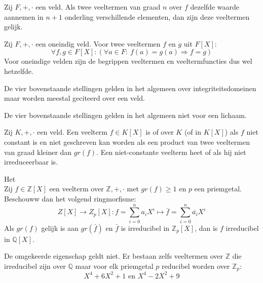 \documentclass[main.tex]{subfiles}
\begin{document}
\begin{st}
  Zij $F,+,\cdot$ een veld.
  Als twee veeltermen van graad $n$ over $f$ dezelfde waarde aannemen in $n+1$ onderling verschillende elementen, dan zijn deze veeltermen gelijk.
\end{st}

\begin{st}
  Zij $F,+,\cdot$ een oneindig veld.
  Voor twee veeltermen $f$ en $g$ uit $F[X]$:
  \[ \forall f,g \in F[X]: (\forall a \in F:\ f(a) = g(a) \Rightarrow f = g) \]
  Voor oneindige velden zijn de begrippen veeltermen en veeltermfuncties dus wel hetzelfde.
\end{st}

\begin{opm}
  De vier bovenstaande stellingen gelden in het algemeen over integriteitsdomeinen maar worden meestal geciteerd over een veld.
\end{opm}

\begin{opm}
  De vier bovenstaande stellingen gelden in het algemeen niet voor een lichaam.
\end{opm}

\begin{de}
  Zij $K,+,\cdot$ een veld.
  Een veelterm $f\in K[X]$ is  of  over $K$ (of in $K[X]$) als $f$ niet constant is en niet geschreven kan worden als een product van twee veeltermen van graad kleiner dan $gr(f)$.
  Een niet-constante veelterm heet  of  als hij niet irreduceerbaar is.
\end{de}

\begin{ei}
  Het \\
  Zij $f\in \mathbb{Z}[X]$ een veelterm over $\mathbb{Z},+,\cdot$ met $gr(f) \ge 1$ en $p$ een priemgetal.
  Beschouww dan het volgend ringmorfisme:
  \[ Z[X] \rightarrow Z_{p}[X]: f = \sum_{i=0}^{n}a_{i}X^{i} \mapsto \bar{f} = \sum_{i=0}^{n}\overline{a_{i}}X^{i} \]
  Als $gr(f)$ gelijk is aan $gr(\bar{f})$ en $\bar{f}$ is irreducibel in $\mathbb{Z}_{p}[X]$, dan is $f$ irreducibel in $\mathbb{Q}[X]$.
\end{ei}

\begin{opm}
  De omgekeerde eigenschap geldt niet.
  Er bestaan zelfs veeltermen over $\mathbb{Z}$ die irreducibel zijn over $\mathbb{Q}$ maar voor elk priemgetal $p$ reducibel worden over $\mathbb{Z}_{p}$:
  \[ X^{4}+ 6X^{2}+1 \text{ en } X^{4} -2X^{2} + 9 \]
\end{opm}
\end{document}
